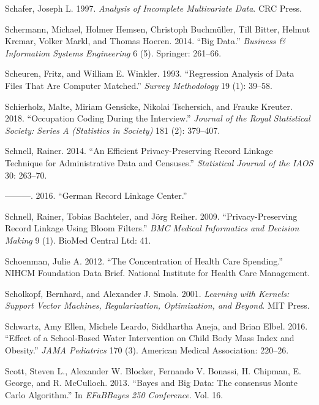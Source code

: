 \documentclass[]{krantz}
\begin{document}
\hypertarget{ref-schafer1997analysis}{}
Schafer, Joseph L. 1997. \emph{Analysis of Incomplete Multivariate
Data}. CRC Press.

\hypertarget{ref-schermann2014big}{}
Schermann, Michael, Holmer Hemsen, Christoph Buchmüller, Till Bitter,
Helmut Krcmar, Volker Markl, and Thomas Hoeren. 2014. ``Big Data.''
\emph{Business \& Information Systems Engineering} 6 (5). Springer:
261--66.

\hypertarget{ref-scheuren1993regression}{}
Scheuren, Fritz, and William E. Winkler. 1993. ``Regression Analysis of
Data Files That Are Computer Matched.'' \emph{Survey Methodology} 19
(1): 39--58.

\hypertarget{ref-Schierholz2018}{}
Schierholz, Malte, Miriam Gensicke, Nikolai Tschersich, and Frauke
Kreuter. 2018. ``Occupation Coding During the Interview.'' \emph{Journal
of the Royal Statistical Society: Series A (Statistics in Society)} 181
(2): 379--407.

\hypertarget{ref-schnell2014efficient}{}
Schnell, Rainer. 2014. ``An Efficient Privacy-Preserving Record Linkage
Technique for Administrative Data and Censuses.'' \emph{Statistical
Journal of the IAOS} 30: 263--70.

\hypertarget{ref-Schnell2016}{}
---------. 2016. ``German Record Linkage Center.''

\hypertarget{ref-schnell2009privacy}{}
Schnell, Rainer, Tobias Bachteler, and Jörg Reiher. 2009.
``Privacy-Preserving Record Linkage Using Bloom Filters.'' \emph{BMC
Medical Informatics and Decision Making} 9 (1). BioMed Central Ltd: 41.

\hypertarget{ref-healthcarespending}{}
Schoenman, Julie A. 2012. ``The Concentration of Health Care Spending.''
NIHCM Foundation Data Brief. National Institute for Health Care
Management.

\hypertarget{ref-Scholkopf2001}{}
Scholkopf, Bernhard, and Alexander J. Smola. 2001. \emph{Learning with
Kernels: Support Vector Machines, Regularization, Optimization, and
Beyond}. MIT Press.

\hypertarget{ref-schwartz2016effect}{}
Schwartz, Amy Ellen, Michele Leardo, Siddhartha Aneja, and Brian Elbel.
2016. ``Effect of a School-Based Water Intervention on Child Body Mass
Index and Obesity.'' \emph{JAMA Pediatrics} 170 (3). American Medical
Association: 220--26.

\hypertarget{ref-scott2013bayes}{}
Scott, Steven L., Alexander W. Blocker, Fernando V. Bonassi, H. Chipman,
E. George, and R. McCulloch. 2013. ``Bayes and Big Data: The consensus
Monte Carlo Algorithm.'' In \emph{EFaBBayes 250 Conference}. Vol. 16.
\end{document}
